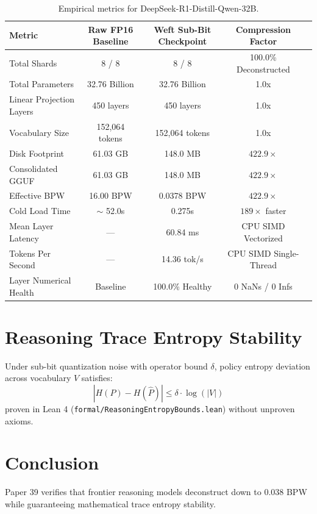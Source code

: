 \documentclass[11pt,a4paper]{article}
\begin{document}
\begin{table}[h]
\centering
\begin{tabular}{lcccc}
\toprule
\textbf{Metric} & \textbf{Raw FP16 Baseline} & \textbf{Weft Sub-Bit Checkpoint} & \textbf{Compression Factor} \\
\midrule
Total Shards & 8 / 8 & 8 / 8 & 100.0\% Deconstructed \\
Total Parameters & 32.76 Billion & 32.76 Billion & 1.0x \\
Linear Projection Layers & 450 layers & 450 layers & 1.0x \\
Vocabulary Size & 152,064 tokens & 152,064 tokens & 1.0x \\
Disk Footprint & 61.03 GB & 148.0 MB & $422.9\times$ \\
Consolidated GGUF & 61.03 GB & 148.0 MB & $422.9\times$ \\
Effective BPW & 16.00 BPW & 0.0378 BPW & $422.9\times$ \\
Cold Load Time & $\sim$ 52.0s & 0.275s & $189\times$ faster \\
Mean Layer Latency & --- & 60.84 ms & CPU SIMD Vectorized \\
Tokens Per Second & --- & 14.36 tok/s & CPU SIMD Single-Thread \\
Layer Numerical Health & Baseline & 100.0\% Healthy & 0 NaNs / 0 Infs \\
\bottomrule
\end{tabular}
\caption{Empirical metrics for DeepSeek-R1-Distill-Qwen-32B.}
\label{tab:deepseek_r1_results}
\end{table}

\section{Reasoning Trace Entropy Stability}
Under sub-bit quantization noise with operator bound $\delta$, policy entropy deviation across vocabulary $V$ satisfies:
\begin{equation}
|H(P) - H(\widehat{P})| \le \delta \cdot \log(|V|)
\end{equation}
proven in Lean 4 (\texttt{formal/ReasoningEntropyBounds.lean}) without unproven axioms.

\section{Conclusion}
Paper 39 verifies that frontier reasoning models deconstruct down to 0.038 BPW while guaranteeing mathematical trace entropy stability.
\end{document}
